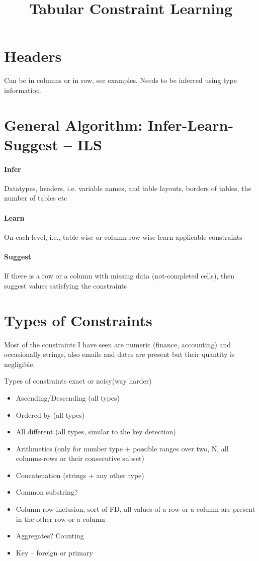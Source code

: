 \documentclass{article}
\title{Tabular Constraint Learning}
\begin{document}
\maketitle
\vspace{-15pt}
\section{Headers}
Can be in columns or in row, see examples. Needs to be inferred using type information.
\vspace{-10pt}
\section{General Algorithm: Infer-Learn-Suggest -- ILS }
\paragraph{Infer} Datatypes, headers, i.e. variable names, and table layouts, borders of tables, the number of tables etc
\vspace{-10pt}
\paragraph{Learn} On each level, i.e., table-wise or column-row-wise learn applicable constraints
\vspace{-10pt}
\paragraph{Suggest} If there is a row or a column with missing data (not-completed cells), then suggest values satisfying the constraints
\vspace{-10pt}
\section*{Types of Constraints}
Most of the constraints I have seen are numeric (finance, accounting) and occasionally strings, also emails and dates are present but their quantity is negligible.

Types of constraints exact or noisy(way harder)
\begin{itemize}
  \item Ascending/Descending (all types)
  \item Ordered by (all types)
  \item All different (all types, similar to the key detection)
  \item Arithmetics (only for number type + possible ranges over two, N, all columns-rows or their consecutive subset)
  \item Concatenation (strings + any other type)
  \item Common substring? 
  \item Column row-inclusion, sort of FD, all values of a row or a column are present in the other row or a column
  \item Aggregates? Counting 
  \item Key -- foreign or primary
\end{itemize}
\end{document}
